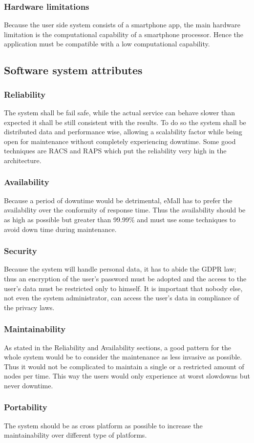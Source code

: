 \subsubsection{Hardware limitations}
Because the user side system consists of a smartphone app, the main hardware limitation is the computational capability of a smartphone processor. Hence the
application must be compatible with a low computational capability.

\subsection{Software system attributes}
\subsubsection{Reliability}
The system shall be fail safe, while the actual service can behave slower than expected it shall be still consistent with the results.
To do so the system shall be distributed data and performance wise, allowing a scalability factor while being open for maintenance without completely experiencing downtime.
Some good techniques are \ac{RACS} and \ac{RAPS} which put the reliability very high in the architecture.
\subsubsection{Availability}
Because a period of downtime would be detrimental, eMall has to prefer the availability over the conformity of response time.
Thus the availability should be as high as possible but greater than 99.99\% and must use some techniques to avoid down time during maintenance.
\subsubsection{Security}
Because the system will handle personal data, it has to abide the \ac{GDPR} law; thus an encryption of the user's password must be adopted and the access to the user's data must be restricted only to himself.
It is important that nobody else, not even the system administrator, can access the user's data in compliance of the privacy laws.\\
\subsubsection{Maintainability}
As stated in the Reliability and Availability sections, a good pattern for the whole system would be to consider the maintenance as less invasive as possible. Thus it would not be complicated to maintain a single or a restricted amount of nodes per time. This way the users would only experience at worst slowdowns but never downtime.
\subsubsection{Portability}
The system should be as cross platform as possible to increase the maintainability over different type of platforms.
\clearpage